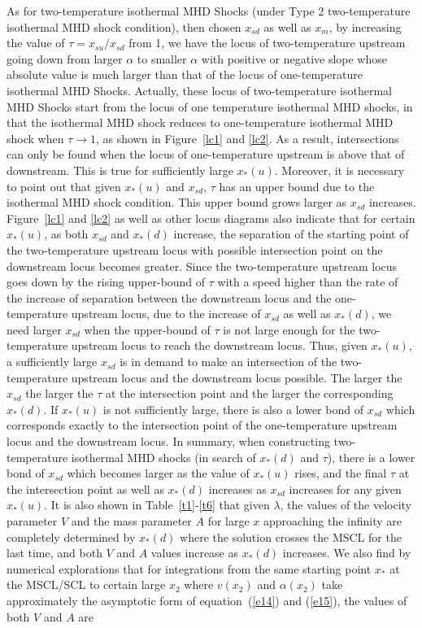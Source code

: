 \documentclass[fleqn,usenatbib]{mnras}
\begin{document}
As for two-temperature isothermal MHD Shocks (under Type 2 two-temperature isothermal MHD shock condition), then chosen $x_{sd}$ as well as $x_{m}$, by increasing the value of $\tau=x_{su}/x_{sd}$ from 1, we have the locus of two-temperature upstream going down from larger $\alpha$ to smaller $\alpha$ with positive or negative slope whose absolute value is much larger than that of the locus of one-temperature isothermal MHD Shocks. Actually, these locus of two-temperature isothermal MHD Shocks start from the locus of one temperature isothermal MHD shocks, in that the isothermal MHD shock reduces to one-temperature isothermal MHD shock when $\tau\rightarrow 1$, as shown in Figure~\ref{lc1} and \ref{lc2}. As a result, intersections can only be found when the locus of one-temperature upstream is above that of downstream. This is true for sufficiently large $x_{*}(u)$. Moreover, it is necessary to point out that given $x_{*}(u)$ and $x_{sd}$, $\tau$ has an upper bound due to the isothermal MHD shock condition. This upper bound grows larger as $x_{sd}$ increases. Figure~\ref{lc1} and \ref{lc2} as well as other locus diagrams also indicate that for certain $x_{*}(u)$, as both $x_{sd}$ and $x_{*}(d)$ increase, the separation of the starting point of the two-temperature upstream locus with possible intersection point on the downstream locus becomes greater. Since the two-temperature upstream locus goes down by the rising upper-bound of $\tau$ with a speed higher than the rate of the increase of separation between the downstream locus and the one-temperature upstream locus, due to the increase of $x_{sd}$ as well as $x_{*}(d)$, we need larger $x_{sd}$ when the upper-bound of $\tau$ is not large enough for the two-temperature upstream locus to reach the downstream locus. Thus, given $x_{*}(u)$, a sufficiently large $x_{sd}$ is in demand to make an intersection of the two-temperature upstream locus and the downstream locus possible. The larger the $x_{sd}$ the larger the $\tau$ at the intersection point and the larger the corresponding $x_{*}(d)$. If $x_{*}(u)$ is not sufficiently large, there is also a lower bond of $x_{sd}$ which corresponds exactly to the intersection point of the one-temperature upstream locus and the downstream locus. In summary, when constructing two-temperature isothermal MHD shocks (in search of $x_{*}(d)$ and $\tau$), there is a lower bond of $x_{sd}$ which becomes larger as the value of $x_{*}(u)$ rises, and the final $\tau$ at the intersection point as well as $x_{*}(d)$ increases as $x_{sd}$ increases for any given $x_{*}(u)$. It is also shown in Table~\ref{t1}-\ref{t6} that given $\lambda$, the values of the velocity parameter $V$ and the mass parameter $A$ for large $x$ approaching the infinity are completely determined by $x_{*}(d)$ where the solution crosses the MSCL for the last time, and both $V$ and $A$ values increase as $x_{*}(d)$ increases. We also find by numerical explorations that for integrations from the same starting point $x_{*}$ at the MSCL/SCL to certain large $x_{2}$ where $v(x_{2})$ and $\alpha(x_{2})$ take approximately the asymptotic form of equation~(\ref{e14}) and (\ref{e15}), the values of both $V$ and $A$ are 
\end{document}
